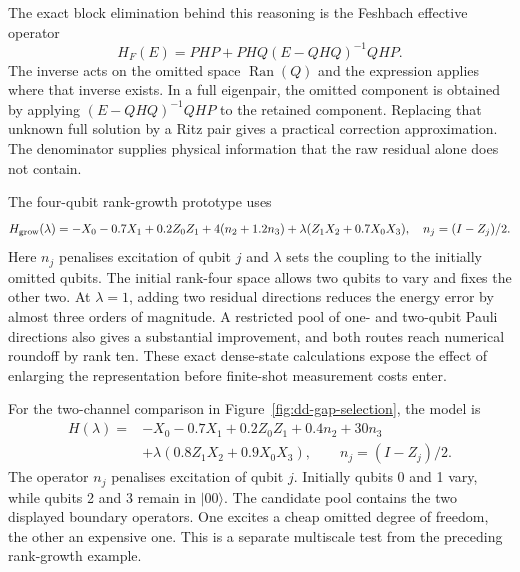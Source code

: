 The exact block elimination behind this reasoning is the Feshbach effective operator
\begin{equation}
 H_F(E)=PHP+PHQ(E-QHQ)^{-1}QHP.
 \label{eq:feshbach}
\end{equation}
The inverse acts on the omitted space $\operatorname{Ran}(Q)$ and the expression applies where that inverse exists. In a full eigenpair, the omitted component is obtained by applying $(E-QHQ)^{-1}QHP$ to the retained component. Replacing that unknown full solution by a Ritz pair gives a practical correction approximation. The denominator supplies physical information that the raw residual alone does not contain.

The four-qubit rank-growth prototype uses
\[
 H_{\rm grow}(\lambda)=-X_0-0.7X_1+0.2Z_0Z_1
 +4(n_2+1.2n_3)+\lambda(Z_1X_2+0.7X_0X_3),
 \quad n_j=(I-Z_j)/2.
\]
Here $n_j$ penalises excitation of qubit $j$ and $\lambda$ sets the coupling to the initially omitted qubits. The initial rank-four space allows two qubits to vary and fixes the other two. At $\lambda=1$, adding two residual directions reduces the energy error by almost three orders of magnitude. A restricted pool of one- and two-qubit Pauli directions also gives a substantial improvement, and both routes reach numerical roundoff by rank ten. These exact dense-state calculations expose the effect of enlarging the representation before finite-shot measurement costs enter.

For the two-channel comparison in Figure~\ref{fig:dd-gap-selection}, the model is
\begin{align}
H(\lambda)={}&-X_0-0.7X_1+0.2Z_0Z_1+0.4n_2+30n_3\nonumber\\
 &+\lambda(0.8Z_1X_2+0.9X_0X_3),\qquad n_j=(I-Z_j)/2 .
\end{align}
The operator $n_j$ penalises excitation of qubit $j$. Initially qubits 0 and 1 vary, while qubits 2 and 3 remain in $|00\rangle$. The candidate pool contains the two displayed boundary operators. One excites a cheap omitted degree of freedom, the other an expensive one. This is a separate multiscale test from the preceding rank-growth example.

